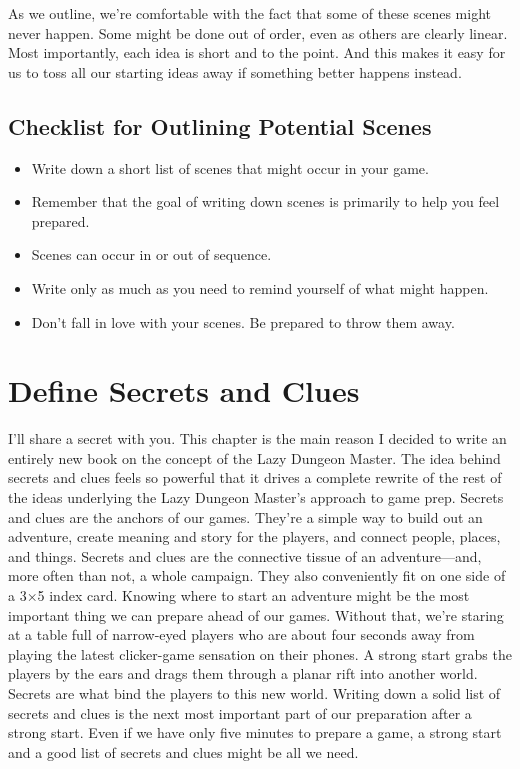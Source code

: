 \documentclass[10pt,a4paper,twoside,bg=print,twocolumn,openany,nodeprecatedcode]{dndbook}
\begin{document}
As we outline, we're comfortable with the fact that some of these scenes might never happen. Some might be done out of order, even as others are clearly linear. Most importantly, each idea is short and to the point. And this makes it easy for us to toss all our starting ideas away if something better happens instead.
\subsection{Checklist for Outlining Potential Scenes}

\begin{itemize}
\item Write down a short list of scenes that might occur in your game.
\item Remember that the goal of writing down scenes is primarily to help you feel prepared.
\item Scenes can occur in or out of sequence.
\item Write only as much as you need to remind yourself of what might happen.
\item Don't fall in love with your scenes. Be prepared to throw them away.
\end{itemize}

\section{Define Secrets and Clues}
I'll share a secret with you. This chapter is the main reason I decided to write an entirely new book on the concept of the Lazy Dungeon Master. The idea behind secrets and clues feels so powerful that it drives a complete rewrite of the rest of the ideas underlying the Lazy Dungeon Master's approach to game prep. Secrets and clues are the anchors of our games. They're a simple way to build out an adventure, create meaning and story for the players, and connect people, places, and things. Secrets and clues are the connective tissue of an adventure—and, more often than not, a whole campaign.
They also conveniently fit on one side of a 3×5 index card.
Knowing where to start an adventure might be the most important thing we can prepare ahead of our games. Without that, we're staring at a table full of narrow-eyed players who are about four seconds away from playing the latest clicker-game sensation on their phones. A strong start grabs the players by the ears and drags them through a planar rift into another world. Secrets are what bind the players to this new world.
Writing down a solid list of secrets and clues is the next most important part of our preparation after a strong start. Even if we have only five minutes to prepare a game, a strong start and a good list of secrets and clues might be all we need.
\end{document}
